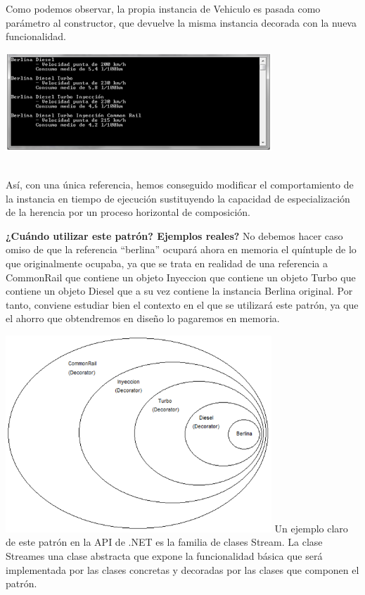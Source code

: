 \begin{flushleft}
Como podemos observar, la propia instancia de Vehiculo es pasada como parámetro al constructor, que devuelve la misma instancia decorada con la nueva funcionalidad.
\textbf{}\\ 
\begin{center}
	\includegraphics[width=10cm]{./Imagenes/decorator19} 
	\end{center}
\textbf{}\\ 
Así, con una única referencia, hemos conseguido modificar el comportamiento de la instancia en tiempo de ejecución sustituyendo la capacidad de especialización de la herencia por un proceso horizontal de composición.

\textbf{¿Cuándo utilizar este patrón? Ejemplos reales?}
No debemos hacer caso omiso de que la referencia “berlina” ocupará ahora en memoria el quíntuple de lo que originalmente ocupaba, ya que se trata en realidad de una referencia a CommonRail que contiene un objeto Inyeccion que contiene un objeto Turbo que contiene un objeto Diesel que a su vez contiene la instancia Berlina original. Por tanto, conviene estudiar bien el contexto en el que se utilizará este patrón, ya que el ahorro que obtendremos en diseño lo pagaremos en memoria.
\textbf{}\\ 
\begin{center}
	\includegraphics[width=10cm]{./Imagenes/decorator20} 
Un ejemplo claro de este patrón en la API de .NET es la familia de clases Stream. La clase Streames una clase abstracta que expone la funcionalidad básica que será implementada por las clases concretas y decoradas por las clases que componen el patrón.
	\end{center}
\textbf{}\\ 


\end{flushleft}

